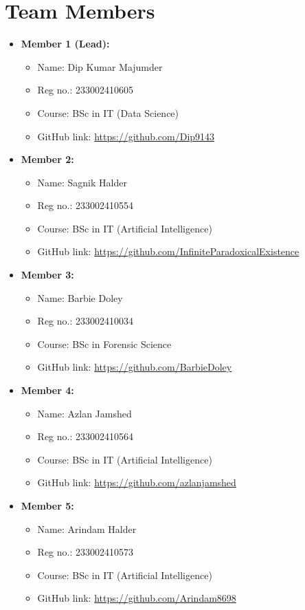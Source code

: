 \documentclass[a4paper,12pt]{article}
\begin{document}
\section*{Team Members}
\begin{itemize}
    \item \textbf{Member 1 (Lead):} 
    \begin{itemize}
        \item Name: Dip Kumar Majumder
        \item Reg no.: 233002410605
        \item Course: BSc in IT (Data Science)
        \item GitHub link: \url{https://github.com/Dip9143}
    \end{itemize}

    \item \textbf{Member 2:} 
    \begin{itemize}
        \item Name: Sagnik Halder
        \item Reg no.: 233002410554
        \item Course: BSc in IT (Artificial Intelligence)
        \item GitHub link: \url{https://github.com/InfiniteParadoxicalExistence}
    \end{itemize}

    \item \textbf{Member 3:} 
    \begin{itemize}
        \item Name: Barbie Doley
        \item Reg no.: 233002410034
        \item Course: BSc in Forensic Science
        \item GitHub link: \url{https://github.com/BarbieDoley}
    \end{itemize}

    \item \textbf{Member 4:} 
    \begin{itemize}
        \item Name: Azlan Jamshed
        \item Reg no.: 233002410564
        \item Course: BSc in IT (Artificial Intelligence)
        \item GitHub link: \url{https://github.com/azlanjamshed}
    \end{itemize}

    \item \textbf{Member 5:} 
    \begin{itemize}
        \item Name: Arindam Halder
        \item Reg no.: 233002410573
        \item Course: BSc in IT (Artificial Intelligence)
        \item GitHub link: \url{https://github.com/Arindam8698}
    \end{itemize}
\end{itemize}
\end{document}

